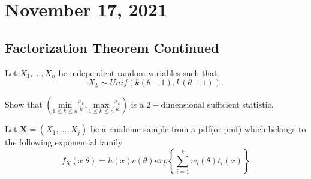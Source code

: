 \section{November 17, 2021}
\subsection{Factorization Theorem Continued}
\begin{example}
    Let $X_1,...,X_n$ be independent random variables such that $$X_k \sim Unif(k(\theta -1), k(\theta+1)).$$
    
    Show that $ \left ( \displaystyle \underset{1 \leq k \leq n}{\mathrm{min}} \frac{x_k}{k}, \underset{1 \leq k \leq n}{\mathrm{max}} \frac{x_k}{k}
    \right )$ is a $2-$dimensional sufficient statistic. 
    
\end{example}

\begin{theorem}
    Let $\boldsymbol{X} = (X_1,...,X_j)$ be a randome sample from a pdf(or pmf) which belongs to the following exponential family
    $$
    f_X(x|\theta) = h(x)c(\theta)exp 
    \left \{ 
    \sum_{i=1}^{k}w_i(\theta)t_i(x)
    \right \}
    $$
\end{theorem}
